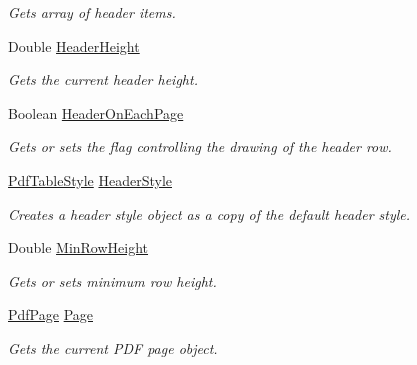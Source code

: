 \begin{DoxyCompactItemize}
\begin{DoxyCompactList}\small\item\em Gets array of header items. \end{DoxyCompactList}\item 
Double \hyperlink{class_pdf_file_writer_1_1_pdf_table_a6f015bb0d3cba3893e2a95ebcc977045}{Header\+Height}
\begin{DoxyCompactList}\small\item\em Gets the current header height. \end{DoxyCompactList}\item 
Boolean \hyperlink{class_pdf_file_writer_1_1_pdf_table_a590e97e8e10d74530bffb85494f11eea}{Header\+On\+Each\+Page}
\begin{DoxyCompactList}\small\item\em Gets or sets the flag controlling the drawing of the header row. \end{DoxyCompactList}\item 
\hyperlink{class_pdf_file_writer_1_1_pdf_table_style}{Pdf\+Table\+Style} \hyperlink{class_pdf_file_writer_1_1_pdf_table_ac44a069b8ba9105bd4a58d3993908644}{Header\+Style}
\begin{DoxyCompactList}\small\item\em Creates a header style object as a copy of the default header style. \end{DoxyCompactList}\item 
Double \hyperlink{class_pdf_file_writer_1_1_pdf_table_afa44012d7c5a2a5b721d5493c21c0de4}{Min\+Row\+Height}
\begin{DoxyCompactList}\small\item\em Gets or sets minimum row height. \end{DoxyCompactList}\item 
\hyperlink{class_pdf_file_writer_1_1_pdf_page}{Pdf\+Page} \hyperlink{class_pdf_file_writer_1_1_pdf_table_a430064f3636c28ed3cb46a3a4535b253}{Page}
\begin{DoxyCompactList}\small\item\em Gets the current P\+DF page object. \end{DoxyCompactList}\item 

\end{DoxyCompactItemize}
